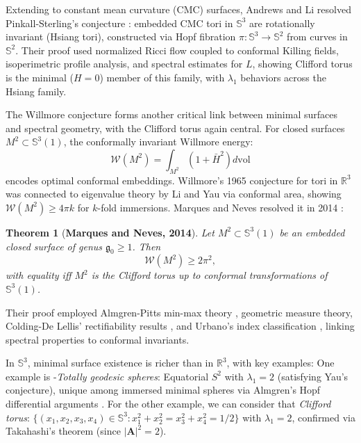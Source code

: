 \documentclass[a4, 12pt]{amsart}
\numberwithin{equation}{section} \numberwithin{equation}{section}
\newtheorem{thm}{Theorem}[section]
\begin{document}
Extending to constant mean curvature (CMC) surfaces, Andrews and Li \cite{AH} resolved Pinkall-Sterling's conjecture \cite{PS}: embedded CMC tori in $\mathbb{S}^3$ are rotationally invariant (Hsiang tori), constructed via Hopf fibration $\pi: \mathbb{S}^3 \to \mathbb{S}^2$ from curves in $\mathbb{S}^2$. Their proof used normalized Ricci flow coupled to conformal Killing fields, isoperimetric profile analysis, and spectral estimates for $L$, showing Clifford torus is the minimal ($H=0$) member of this family, with $\lambda_1$ behaviors across the Hsiang family.














The Willmore conjecture forms another critical link between minimal surfaces and spectral geometry, with the Clifford torus again central. For closed surfaces $M^2 \subset \mathbb{S}^3(1)$, the conformally invariant Willmore energy:
\begin{equation}\label{W-energy}
\mathcal{W}(M^{2}) = \int_{M^{2}} (1 + \bar{H}^{2}) d\mathrm{vol}
\end{equation}
encodes optimal conformal embeddings. Willmore's 1965 conjecture \cite{Will} for tori in $\mathbb{R}^3$ was connected to eigenvalue theory by Li and Yau \cite{LY} via conformal area, showing $\mathcal{W}(M^2) \geq 4\pi k$ for $k$-fold immersions. Marques and Neves resolved it in 2014 \cite{MN}:
\begin{thm}[\textbf{Marques and Neves, 2014}]\label{thm-MN}
Let $M^{2} \subset \mathbb{S}^{3}(1)$ be an embedded closed surface of genus $\mathfrak{g}_{0}\geq 1$. Then
\begin{equation}\label{will-conj-ineq}
\mathcal{W}(M^{2}) \geq 2 \pi^{2},
\end{equation}
with equality iff $M^{2}$ is the Clifford torus up to conformal transformations of $\mathbb{S}^{3}(1)$.
\end{thm}
Their proof employed Almgren-Pitts min-max theory \cite{Pit}, geometric measure theory, Colding-De Lellis' rectifiability results \cite{CL}, and Urbano's index classification \cite{Urb}, linking spectral properties to conformal invariants.

In $\mathbb{S}^3$, minimal surface existence is richer than in $\mathbb{R}^3$, with key examples: One example is
-\textit{Totally geodesic spheres}: Equatorial $S^2$ with $\lambda_1=2$ (satisfying Yau's conjecture), unique among immersed minimal spheres via Almgren's Hopf differential arguments \cite{Ajm}.
For the other example, we can consider that \textit{Clifford torus}: $\{(x_1,x_2,x_3,x_4) \in \mathbb{S}^3 : x_1^2+x_2^2 = x_3^2+x_4^2 = 1/2\}$ with $\lambda_1=2$, confirmed via Takahashi's theorem \cite{Tak} (since $|\mathbf{A}|^2 = 2$).
\end{document}
